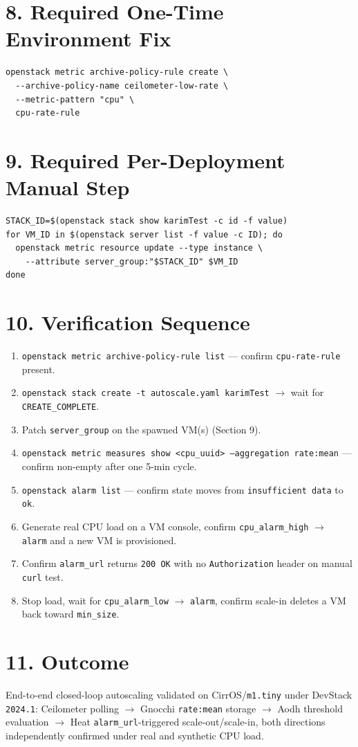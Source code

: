 \documentclass[10pt,a4paper]{article}
\begin{document}
\section*{8. Required One-Time Environment Fix}
\begin{lstlisting}
openstack metric archive-policy-rule create \
  --archive-policy-name ceilometer-low-rate \
  --metric-pattern "cpu" \
  cpu-rate-rule
\end{lstlisting}

\section*{9. Required Per-Deployment Manual Step}
\begin{lstlisting}
STACK_ID=$(openstack stack show karimTest -c id -f value)
for VM_ID in $(openstack server list -f value -c ID); do
  openstack metric resource update --type instance \
    --attribute server_group:"$STACK_ID" $VM_ID
done
\end{lstlisting}

\section*{10. Verification Sequence}
\begin{enumerate}
    \item \texttt{openstack metric archive-policy-rule list} --- confirm \texttt{cpu-rate-rule} present.
    \item \texttt{openstack stack create -t autoscale.yaml karimTest} $\to$ wait for \texttt{CREATE\_COMPLETE}.
    \item Patch \texttt{server\_group} on the spawned VM(s) (Section 9).
    \item \texttt{openstack metric measures show <cpu\_uuid> --aggregation rate:mean} --- confirm non-empty after one 5-min cycle.
    \item \texttt{openstack alarm list} --- confirm state moves from \texttt{insufficient data} to \texttt{ok}.
    \item Generate real CPU load on a VM console, confirm \texttt{cpu\_alarm\_high} $\to$ \texttt{alarm} and a new VM is provisioned.
    \item Confirm \texttt{alarm\_url} returns \texttt{200 OK} with no \texttt{Authorization} header on manual \texttt{curl} test.
    \item Stop load, wait for \texttt{cpu\_alarm\_low} $\to$ \texttt{alarm}, confirm scale-in deletes a VM back toward \texttt{min\_size}.
\end{enumerate}

\section*{11. Outcome}
End-to-end closed-loop autoscaling validated on CirrOS/\texttt{m1.tiny} under DevStack \texttt{2024.1}: Ceilometer polling $\to$ Gnocchi \texttt{rate:mean} storage $\to$ Aodh threshold evaluation $\to$ Heat \texttt{alarm\_url}-triggered scale-out/scale-in, both directions independently confirmed under real and synthetic CPU load.
\end{document}
